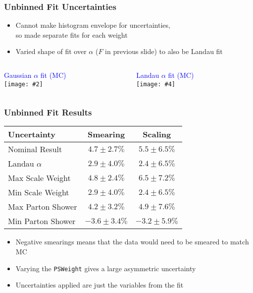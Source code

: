 \documentclass{beamer}
\newcommand{\twofigs}[4]{
  \begin{columns}
    \begin{column}{0.5\linewidth}
      \centering
      \textcolor{blue}{#1} \\
      \texttt{[image: \#2]}
    \end{column}
    \begin{column}{0.5\linewidth}
      \centering
      \textcolor{blue}{#3} \\
      \texttt{[image: \#4]}
    \end{column}
  \end{columns}
}
\begin{document}
\begin{frame}
  \frametitle{Unbinned Fit Uncertainties}

  \begin{itemize}
  \item Cannot make histogram envelope for uncertainties, \\
    so made separate fits for each weight
  \item Varied shape of fit over $\alpha$ ($F$ in previous slide) to also be Landau fit
  \end{itemize}

  \twofigs{Gaussian $\alpha$ fit (MC)}
          {200121_roofit/Gaussian_xsec_weight_mc.pdf}
          {Landau $\alpha$ fit (MC)}
          {200121_roofit/Landau_xsec_weight_mc.pdf}

\end{frame}


\begin{frame}
  \frametitle{Unbinned Fit Results}

  \centering

  \begin{tabular}{|l|c|c|}
    \hline
    Uncertainty & Smearing & Scaling \\
    \hline
    Nominal Result & $4.7 \pm 2.7 \%$ & $5.5 \pm 6.5 \%$ \\
    Landau $\alpha$ & $2.9 \pm 4.0 \%$ & $2.4 \pm 6.5 \%$ \\
    \hline
    Max Scale Weight & $4.8 \pm 2.4 \%$ & $6.5 \pm 7.2 \%$ \\
    Min Scale Weight & $2.9 \pm 4.0 \%$ & $2.4 \pm 6.5 \%$ \\
    \hline
    Max Parton Shower & $4.2 \pm 3.2 \%$ & $4.9 \pm 7.6 \%$ \\
    Min Parton Shower & $-3.6 \pm 3.4 \%$ & $-3.2 \pm 5.9 \%$ \\
    \hline
  \end{tabular}

  \begin{itemize}
  \item Negative smearings means that the data would need to be smeared to match MC
  \item Varying the \texttt{PSWeight} gives a large asymmetric uncertainty
  \item Uncertainties applied are just the variables from the fit
  \end{itemize}

\end{frame}
\end{document}
